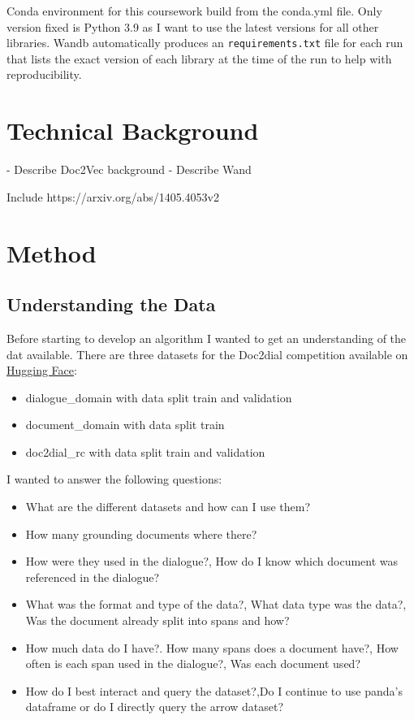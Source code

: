 \documentclass[11pt]{article}
\begin{document}
    Conda environment for this coursework build from the conda.yml file. Only version fixed is Python 3.9 as I want
    to use the latest versions for all other libraries. Wandb \cite{wandb} automatically produces an \texttt{requirements.txt}
    file for each run that lists the exact version of each library at the time of the run to help with reproducibility.


    \section{Technical Background}\label{sec:technical-background}

    - Describe Doc2Vec background
    - Describe Wand

    Include https://arxiv.org/abs/1405.4053v2


    \section{Method}\label{sec:method}

    \subsection{Understanding the Data}\label{subsec:understanding-the-data-method}
    Before starting to develop an algorithm I wanted to get an understanding of the dat available.
    There are three datasets for the Doc2dial competition available on \href{https://huggingface.co/datasets/doc2dial}{Hugging Face}:
    \begin{itemize}
        \item dialogue\_domain with data split train and validation
        \item document\_domain with data split train
        \item doc2dial\_rc with data split train and validation
    \end{itemize}

    I wanted to answer the following questions:
    \begin{itemize}
        \item What are the different datasets and how can I use them?
        \item How many grounding documents where there?
        \item How were they used in the dialogue?, How do I know which document was referenced in the dialogue?
        \item What was the format and type of the data?, What data type was the data?,
        Was the document already split into spans and how?
        \item How much data do I have?. How many spans does a document have?, How often is each span used in the dialogue?,
        Was each document used?
        \item How do I best interact and query the dataset?,Do I continue to use panda's dataframe or do I directly query
        the arrow dataset?
    \end{itemize}
\end{document}
